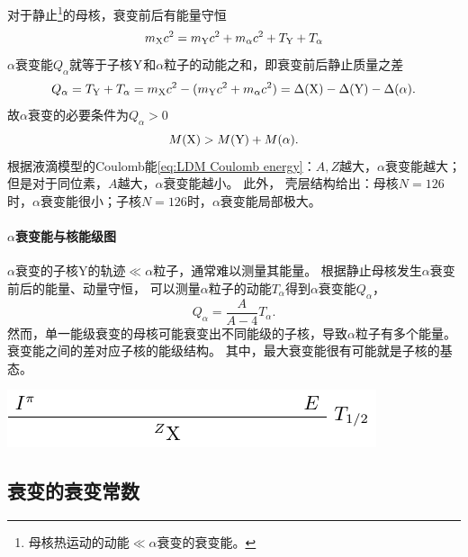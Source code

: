 对于静止\footnote{母核热运动的动能$\ll\alpha$衰变的衰变能。}的母核，衰变前后有能量守恒
\[
	m_{\mathrm{X}}c^2=m_{\mathrm{Y}}c^2+m_\alpha c^2+T_{\mathrm{Y}}+T_\alpha
\]
$\alpha$衰变能$Q_\alpha$就等于子核$\mathrm{Y}$和$\alpha$粒子的动能之和，即衰变前后静止质量之差
\begin{equation}
	Q_\alpha=T_{\mathrm{Y}}+T_\alpha=m_{\mathrm{X}}c^2-(m_{\mathrm{Y}}c^2+m_\alpha c^2)=\Delta(\mathrm{X})-\Delta(\mathrm{Y})-\Delta(\alpha).
\end{equation}
故$\alpha$衰变的必要条件为$Q_\alpha>0$
\[
	M(\mathrm{X})>M(\mathrm{Y})+M(\alpha).
\]
根据液滴模型的Coulomb能\eqref{eq:LDM Coulomb energy}：$A,Z$越大，$\alpha$衰变能越大；但是对于同位素，$A$越大，$\alpha$衰变能越小。
此外，
壳层结构给出：母核$N=126$时，$\alpha$衰变能很小；子核$N=126$时，$\alpha$衰变能局部极大。

\paragraph{$\alpha$衰变能与核能级图}

$\alpha$衰变的子核Y的轨迹$\ll\alpha$粒子，通常难以测量其能量。
根据静止母核发生$\alpha$衰变前后的能量、动量守恒，
可以测量$\alpha$粒子的动能$T_\alpha$得到$\alpha$衰变能$Q_\alpha$，
\begin{equation}
	Q_\alpha=\frac A{A-4}T_\alpha.
\end{equation}
然而，单一能级衰变的母核可能衰变出不同能级的子核，导致$\alpha$粒子有多个能量。衰变能之间的差对应子核的能级结构。
其中，最大衰变能很有可能就是子核的基态。

\begin{center}
	\includegraphics[page=4]{figures/tikz/layouts.pdf}
	\label{fig:decay alpha}
\end{center}

\subsection{\textalpha 衰变的衰变常数}

